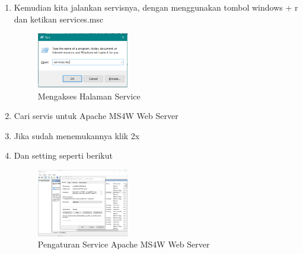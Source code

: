 \begin{enumerate}
  \item Kemudian kita jalankan servisnya, dengan menggunakan tombol windows + r dan ketikan services.msc
  \hfill\break
    \begin{figure}[H]
		\includegraphics[width=4cm]{figures/1174026/4/7.png}
		\centering
		\caption{Mengakses Halaman Service}
    \end{figure}
  \item Cari servis untuk Apache MS4W Web Server
  \item Jika sudah menemukannya klik 2x
  \item Dan setting seperti berikut
  \hfill\break
    \begin{figure}[H]
		\includegraphics[width=4cm]{figures/1174026/4/9.png}
		\centering
		\caption{Pengaturan Service Apache MS4W Web Server}
    \end{figure}
\end{enumerate}
